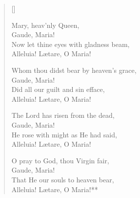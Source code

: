 
\newHymn


\begin{verse}[\versewidth]

 Mary, heav’nly Queen,\\
Gaude, Maria!\\
Now let thine eyes with gladness beam,\\
Alleluia! Lætare, O Maria!

Whom thou didst bear by heaven’s grace,\\
Gaude, Maria!\\
Did all our guilt and sin efface,\\
Alleluia! Lætare, O Maria!

The Lord has risen from the dead,\\
Gaude, Maria!\\
He rose with might as He had said,\\
Alleluia! Lætare, O Maria!

O pray to God, thou Virgin fair,\\
Gaude, Maria!\\
That He our souls to heaven bear,\\
Alleluia! Lætare, O Maria!**

\end{verse}


